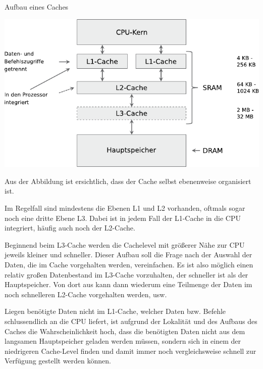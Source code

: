 \documentclass[german]{spicker}
\begin{document}
\begin{bonus}{Aufbau eines Caches}
    \begin{center}
        \includegraphics[]{images/cache_aufbau.pdf}
    \end{center}

    Aus der Abbildung ist ersichtlich, dass der Cache selbst ebenenweise organisiert ist.

    Im Regelfall sind mindestens die Ebenen L1 und L2 vorhanden, oftmals sogar noch
    eine dritte Ebene L3. Dabei ist in jedem Fall der L1-Cache in die CPU integriert,
    häufig auch noch der L2-Cache.

    Beginnend beim
    L3-Cache werden die Cachelevel mit größerer Nähe zur CPU jeweils kleiner und
    schneller. Dieser Aufbau soll die Frage nach der Auswahl der Daten, die im Cache
    vorgehalten werden, vereinfachen. Es ist also möglich einen relativ großen Datenbestand
    im L3-Cache vorzuhalten, der schneller ist als der Hauptspeicher. Von dort
    aus kann dann wiederum eine Teilmenge der Daten im noch schnelleren L2-Cache
    vorgehalten werden, usw.

    Liegen benötigte Daten nicht im L1-Cache, welcher Daten bzw. Befehle schlussendlich an die CPU liefert, ist aufgrund der Lokalität und
    des Aufbaus des Caches die Wahrscheinlichkeit hoch, dass die benötigten Daten
    nicht aus dem langsamen Hauptspeicher geladen werden müssen, sondern sich in
    einem der niedrigeren Cache-Level finden und damit immer noch vergleichsweise
    schnell zur Verfügung gestellt werden können.
\end{bonus}
\end{document}
